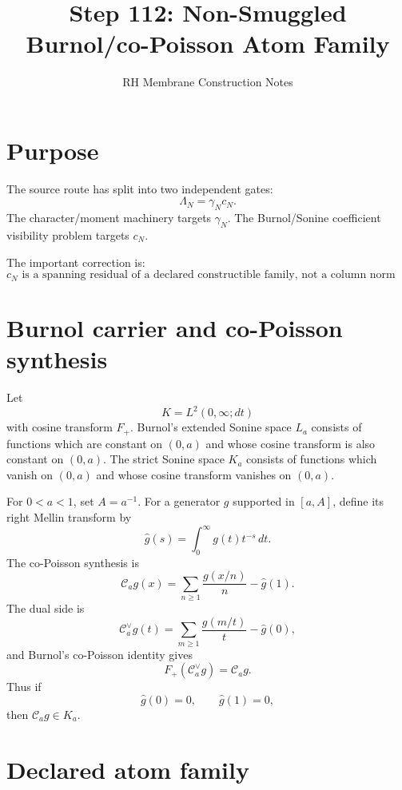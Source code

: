 \documentclass[11pt]{article}
\title{Step 112: Non-Smuggled Burnol/co-Poisson Atom Family}
\author{RH Membrane Construction Notes}
\date{}
\begin{document}
\maketitle

\section{Purpose}

The source route has split into two independent gates:
\[
\Lambda_N=\gamma_N c_N.
\]
The character/moment machinery targets \(\gamma_N\).  The Burnol/Sonine
coefficient visibility problem targets \(c_N\).

The important correction is:
\[
\boxed{
c_N\text{ is a spanning residual of a declared constructible family, not a column norm bound on a fixed map.}
}
\]

\section{Burnol carrier and co-Poisson synthesis}

Let
\[
K=L^2(0,\infty;dt)
\]
with cosine transform \(F_+\).  Burnol's extended Sonine space \(L_a\) consists of functions
which are constant on \((0,a)\) and whose cosine transform is also constant on \((0,a)\).  The
strict Sonine space \(K_a\) consists of functions which vanish on \((0,a)\) and whose cosine
transform vanishes on \((0,a)\).

For \(0<a<1\), set \(A=a^{-1}\).  For a generator \(g\) supported in \([a,A]\), define its right
Mellin transform by
\[
\widehat g(s)=\int_0^\infty g(t)t^{-s}\,dt.
\]
The co-Poisson synthesis is
\[
\mathcal C_a g(x)
=
\sum_{n\ge 1}\frac{g(x/n)}{n}
-
\widehat g(1).
\]
The dual side is
\[
\mathcal C_a^\vee g(t)
=
\sum_{m\ge 1}\frac{g(m/t)}{t}
-
\widehat g(0),
\]
and Burnol's co-Poisson identity gives
\[
F_+(\mathcal C_a^\vee g)=\mathcal C_a g.
\]
Thus if
\[
\widehat g(0)=0,\qquad \widehat g(1)=0,
\]
then \(\mathcal C_a g\in K_a\).

\section{Declared atom family}
\end{document}
